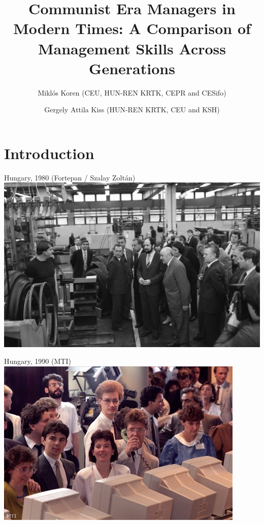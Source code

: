 \documentclass[
  ignorenonframetext,
  aspectratio=1610,
]{beamer}
\title{Communist Era Managers in Modern Times: A Comparison of
Management Skills Across Generations}
\author{Miklós Koren (CEU, HUN-REN KRTK, CEPR and CESifo) \and Gergely
Attila Kiss (HUN-REN KRTK, CEU and KSH)}
\date{March 21, 2024\footnote<.->{Supported by Forefront Research
  Excellence Grant (144193), and the European Research Council (313164
  and 101097789)}}
\begin{document}
\frame{\titlepage}

\section{Introduction}\label{introduction}

\begin{frame}{Hungary, 1980 (Fortepan / Szalay Zoltán)}
\protect\hypertarget{hungary-1980-fortepan-szalay-zoltuxe1n}{}
\includegraphics{fig/fortepan_198036.jpg}
\end{frame}

\begin{frame}{Hungary, 1990 (MTI)}
\protect\hypertarget{hungary-1990-mti}{}
\includegraphics{fig/tozsde.jpg}
\end{frame}
\end{document}
